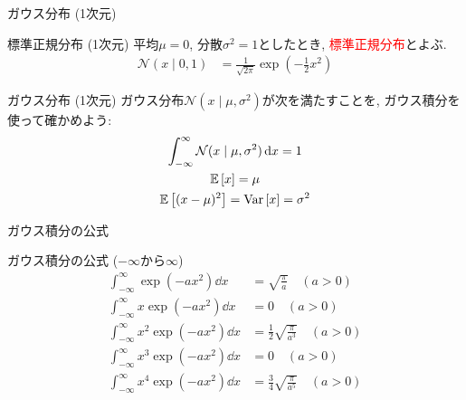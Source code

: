 \documentclass[dvipdfmx,notheorems,t]{beamer}
\begin{document}
\begin{frame}{ガウス分布 (1次元)}
\begin{block}{標準正規分布 (1次元)}
  平均$\mu = 0$, 分散$\sigma^2 = 1$としたとき, \textcolor{red}{標準正規分布}とよぶ.
  \begin{align*}
    \mathcal{N}(x \mid 0, 1) &= \frac{1}{\sqrt{2\pi}} \exp(-\frac{1}{2} x^2)
  \end{align*}
\end{block}
\end{frame}

\begin{frame}{ガウス分布 (1次元)}
ガウス分布$\mathcal{N}(x \mid \mu, \sigma^2)$が次を満たすことを, ガウス積分を使って確かめよう:
\begin{gather*}
  \int_{-\infty}^\infty \mathcal{N}(x \mid \mu, \sigma^2) \dd{x} = 1 \\
  \operatorname{\mathbb{E}} \left[ x \right] = \mu \\
  \operatorname{\mathbb{E}} \left[ (x - \mu)^2 \right] = \operatorname{Var} \left[ x \right] = \sigma^2
\end{gather*}
\end{frame}

\begin{frame}{ガウス積分の公式}
\begin{block}{ガウス積分の公式 ($-\infty$から$\infty$)}
  \begin{align*}
    \int_{-\infty}^\infty \exp \left( -a x^2 \right) \dd{x}
      &= \sqrt{\frac{\pi}{a}} \quad (a > 0) \\
    \int_{-\infty}^\infty x \exp \left( -a x^2 \right) \dd{x}
      &= 0 \quad (a > 0) \\
    \int_{-\infty}^\infty x^2 \exp \left( -a x^2 \right) \dd{x}
      &= \frac{1}{2} \sqrt{\frac{\pi}{a^3}} \quad (a > 0) \\
    \int_{-\infty}^\infty x^3 \exp \left( -a x^2 \right) \dd{x}
      &= 0 \quad (a > 0) \\
    \int_{-\infty}^\infty x^4 \exp \left( -a x^2 \right) \dd{x}
      &= \frac{3}{4} \sqrt{\frac{\pi}{a^5}} \quad (a > 0)
  \end{align*}
\end{block}
\end{frame}
\end{document}
